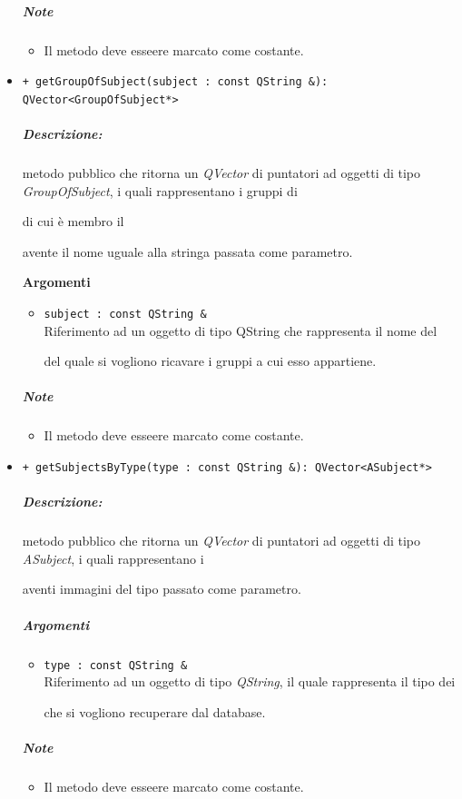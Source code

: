 \begin{itemize}
		\subparagraph{Note}
				\begin{itemize}
					\item Il metodo deve esseere marcato come costante.
				\end{itemize}
	
	\item\color{blue}\verb!+ getGroupOfSubject(subject : const QString &): QVector<GroupOfSubject*>!
	\color{black} 
	\subparagraph{Descrizione:} metodo pubblico che ritorna un \textsl{QVector} di puntatori ad oggetti di tipo \textsl{GroupOfSubject}, i quali rappresentano i gruppi di \subject{} di cui è membro il \subject{} avente il nome uguale alla stringa passata come parametro.
	
	\textbf{Argomenti}
	\begin{itemize}
	\item \color{RoyalPurple}\verb!subject : const QString &! \\ 
	\color{black}Riferimento ad un oggetto di tipo QString che rappresenta il nome del \subject{} del quale si vogliono ricavare i gruppi a cui esso appartiene.
	\end{itemize}

		\subparagraph{Note}
				\begin{itemize}
					\item Il metodo deve esseere marcato come costante.
				\end{itemize}
				
	\item \color{blue}\verb!+ getSubjectsByType(type : const QString &): QVector<ASubject*>!
	\color{black} 
	\subparagraph{Descrizione:} metodo pubblico che ritorna un \textsl{QVector} di puntatori ad oggetti di tipo \textsl{ASubject}, i quali rappresentano i \subject{} aventi immagini del tipo passato come parametro.
	\subparagraph{Argomenti}
	\begin{itemize}
		\item \color{RoyalPurple}\verb!type : const QString &!\\
		\color{black}Riferimento ad un oggetto di tipo \textsl{QString}, il quale rappresenta il tipo dei \subject{} che si vogliono recuperare dal database.
	\end{itemize}
	\subparagraph{Note}
		\begin{itemize}
			\item Il metodo deve esseere marcato come costante.
		\end{itemize}
		

\end{itemize}
